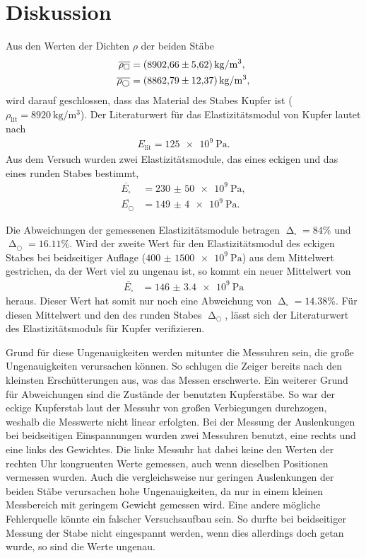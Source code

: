 \section{Diskussion}
\label{sec:Diskussion}

Aus den Werten der Dichten $\rho$ der beiden Stäbe
\begin{align*}
    \overline{\rho_\square} &= \SI{8902.66 (5.62)}{\kilo\gram\per\meter^3}, \\
    \overline{\rho_\bigcirc} &= \SI{8862.79 (12.37)}{\kilo\gram\per\meter^3}, \\
\end{align*}
wird darauf geschlossen, dass das Material des Stabes Kupfer ist ($\rho_{\text{lit}} = \SI{8920}{\kilo\gram\per\meter^3}$).
Der Literaturwert für das Elastizitätsmodul von Kupfer lautet nach \cite{czichos}
\begin{align*}
    E_{\text{lit}} = \SI{125e9}{\Pa}.
\end{align*}
Aus dem Versuch wurden zwei Elastizitätsmodule, das eines eckigen und das eines runden Stabes bestimmt,
\begin{align*}
    \overline{E_{\square}} &= \SI{230(50)e9}{\Pa}, \\
    \overline{E_{\bigcirc}} &= \SI{149(4)e9}{\Pa}.
\end{align*}

\sloppy
Die Abweichungen der gemessenen Elastizitätsmodule betragen
$\upDelta_{\square} = 84 \%$ und $\upDelta_{\bigcirc} = 16.11 \%$.
Wird der zweite Wert für den Elastizitätsmodul des eckigen Stabes bei beidseitiger Auflage ($\SI{400(1500)e9}{\Pa}$)
aus dem Mittelwert gestrichen, da der Wert viel zu ungenau ist, so kommt ein neuer Mittelwert von
\begin{align*}
    \overline{E_{\square}} &= \SI{146(3.4)e9}{\Pa}
\end{align*}
heraus. Dieser Wert hat somit nur noch eine Abweichung von $\upDelta_{\square} = 14.38 \%$.
Für diesen Mittelwert und den des runden Stabes $\upDelta_{\bigcirc}$, lässt sich der Literaturwert 
des Elastizitätsmoduls für Kupfer verifizieren.

Grund für diese Ungenauigkeiten werden mitunter die Messuhren sein, die große Ungenauigkeiten verursachen können.
So schlugen die Zeiger bereits nach den kleinsten Erschütterungen aus, was das Messen erschwerte. 
Ein weiterer Grund für Abweichungen sind die Zustände der benutzten Kupferstäbe. So war der eckige Kupferstab laut der Messuhr
von großen Verbiegungen durchzogen, weshalb die Messwerte nicht linear erfolgten.
Bei der Messung der Auslenkungen bei beidseitigen Einspannungen wurden zwei Messuhren benutzt, eine rechts und eine links des Gewichtes.
Die linke Messuhr hat dabei keine den Werten der rechten Uhr kongruenten Werte gemessen, auch wenn dieselben Positionen vermessen wurden.
Auch die vergleichsweise nur geringen Auslenkungen der beiden Stäbe verursachen hohe Ungenauigkeiten, da nur in einem
kleinen Messbereich mit geringem Gewicht gemessen wird.
Eine andere mögliche Fehlerquelle könnte ein falscher Versuchsaufbau sein. So durfte bei beidseitiger Messung der Stabe nicht
eingespannt werden, wenn dies allerdings doch getan wurde, so sind die Werte ungenau.



